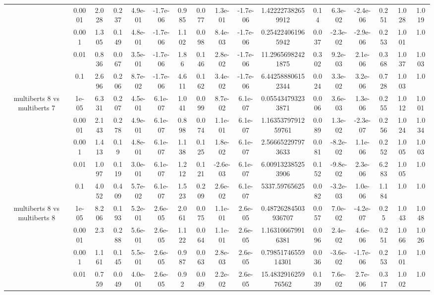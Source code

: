 \begin{tabular}{|c|c|c|c|c|c|c|c|c|c|c|c|c|c|c|c|c|}
 & 0.0001 & 2.028 & 0.237 & 4.9e-01 & -1.7e-06 & 0.985 & 0.077 & 1.3e-01 & -1.7e-06 & 1.422227382659912 & 0.14 & 6.3e-02 & -2.4e-06 & 0.251 & 1.028 & 1.019 \\
 & 0.001 & 1.305 & 0.149 & 4.8e-01 & -1.7e-06 & 1.102 & 0.098 & 8.4e-03 & -1.7e-06 & 0.254224061965942 & 0.037 & -2.3e-02 & -2.9e-06 & 0.253 & 1.001 & 1.0 \\
 & 0.01 & 0.836 & 0.067 & 3.5e-01 & -1.7e-06 & 1.86 & 0.146 & 2.8e-02 & -1.7e-06 & 11.29656982421875 & 0.302 & 9.2e-03 & 2.1e-06 & 0.368 & 1.037 & 1.003 \\
 & 0.1 & 2.696 & 0.206 & 8.7e-02 & -1.7e-06 & 4.611 & 0.162 & 3.4e-02 & -1.7e-06 & 6.442588806152344 & 0.024 & 3.3e-02 & 3.2e-06 & 0.728 & 1.003 & 1.0 \\
\hline
\multirow{5}{*}{multiberts 8 vs multiberts 7} & 1e-05 & 6.331 & 0.207 & 4.5e-01 & 6.1e-07 & 1.041 & 0.099 & 8.7e-02 & 6.1e-07 & 0.055434793233871 & 0.006 & 3.6e-03 & 1.3e-06 & 0.255 & 1.012 & 1.001 \\
 & 0.0001 & 2.143 & 0.278 & 4.9e-01 & 6.1e-07 & 0.898 & 0.074 & 1.1e-01 & 6.1e-07 & 1.1635379791259761 & 0.089 & 1.3e-02 & -2.3e-07 & 0.256 & 1.024 & 1.034 \\
 & 0.001 & 1.413 & 0.19 & 4.8e-01 & 6.1e-07 & 1.138 & 0.125 & 1.8e-02 & 6.1e-07 & 2.566652297973633 & 0.081 & -8.2e-02 & 1.1e-06 & 0.252 & 1.005 & 1.003 \\
 & 0.01 & 1.097 & 0.119 & 3.0e-01 & 6.1e-07 & 1.212 & 0.121 & -2.6e-03 & 6.1e-07 & 6.009132385253906 & 0.152 & -9.8e-02 & 2.3e-06 & 6.283 & 1.005 & 1.0 \\
 & 0.1 & 4.052 & 0.409 & 5.7e-02 & 6.1e-07 & 1.523 & 0.209 & 2.6e-02 & 6.1e-07 & 5337.59765625 & 0.082 & -3.2e-03 & 1.0e-06 & 1.184 & 1.0 & 1.0 \\
\hline
\multirow{5}{*}{multiberts 8 vs multiberts 8} & 1e-05 & 8.206 & 0.193 & 5.2e-01 & 2.6e-05 & 2.061 & 0.075 & 1.1e-01 & 2.6e-05 & 0.48726284503936707 & 0.057 & 7.0e-02 & -4.2e-07 & 0.25 & 1.043 & 1.048 \\
 & 0.0001 & 2.3 & 0.288 & 5.6e-01 & 2.6e-05 & 1.122 & 0.064 & 1.1e-01 & 2.6e-05 & 1.163106679916381 & 0.096 & 2.4e-02 & 4.6e-06 & 0.251 & 1.066 & 1.026 \\
 & 0.001 & 1.161 & 0.145 & 5.5e-01 & 2.6e-05 & 0.987 & 0.063 & 2.8e-03 & 2.6e-05 & 0.7985174655914301 & 0.036 & -3.6e-02 & -1.7e-06 & 0.253 & 1.001 & 1.0 \\
 & 0.01 & 0.759 & 0.049 & 4.0e-01 & 2.6e-05 & 0.92 & 0.049 & 2.2e-02 & 2.6e-05 & 15.483291625976562 & 0.139 & 7.6e-02 & 2.7e-06 & 0.317 & 1.002 & 1.0 \\

\end{tabular}
